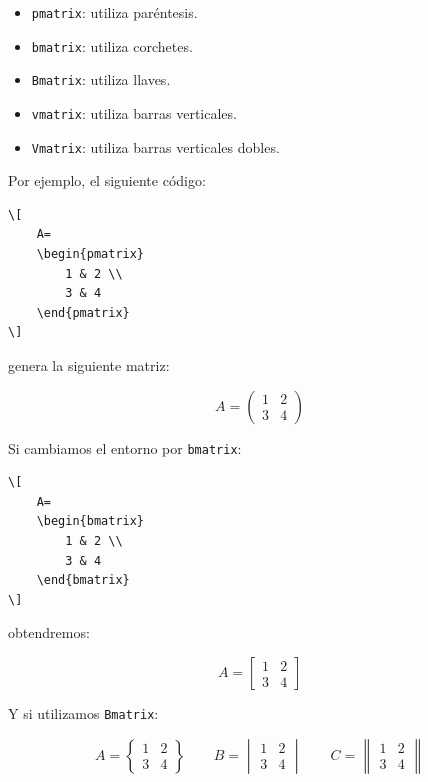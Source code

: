 \documentclass[11pt,a4paper]{article}
\theoremstyle{plain}
\theoremstyle{definition}
\theoremstyle{remark}
\theoremstyle{exercise}
\begin{document}
\begin{itemize}
    \item \verb|pmatrix|: utiliza paréntesis.
    \item \verb|bmatrix|: utiliza corchetes.
    \item \verb|Bmatrix|: utiliza llaves.
    \item \verb|vmatrix|: utiliza barras verticales.
    \item \verb|Vmatrix|: utiliza barras verticales dobles.
\end{itemize}

\noindent Por ejemplo, el siguiente código:

\begin{lstlisting}
\[
    A=
    \begin{pmatrix}
        1 & 2 \\
        3 & 4
    \end{pmatrix}
\]
\end{lstlisting}

\noindent genera la siguiente matriz:

\begin{paginarecuadrada}
\[
    A=
    \begin{pmatrix}
        1 & 2 \\
        3 & 4
    \end{pmatrix}
\]
\end{paginarecuadrada}

\medskip

\noindent Si cambiamos el entorno por \verb|bmatrix|:

\begin{lstlisting}
\[
    A=
    \begin{bmatrix}
        1 & 2 \\
        3 & 4
    \end{bmatrix}
\]
\end{lstlisting}

\noindent obtendremos:

\begin{paginarecuadrada}
\[
    A=
    \begin{bmatrix}
        1 & 2 \\
        3 & 4
    \end{bmatrix}
\]
\end{paginarecuadrada}

\noindent Y si utilizamos \verb|Bmatrix|:

\begin{paginarecuadrada}
\[
    A=
    \begin{Bmatrix}
        1 & 2 \\
        3 & 4
    \end{Bmatrix}
    \qquad 
    B=
    \begin{vmatrix}
        1 & 2 \\
        3 & 4
    \end{vmatrix}
    \qquad
    C=
    \begin{Vmatrix}
        1 & 2 \\
        3 & 4
    \end{Vmatrix}
\]
\end{paginarecuadrada}
\end{document}
